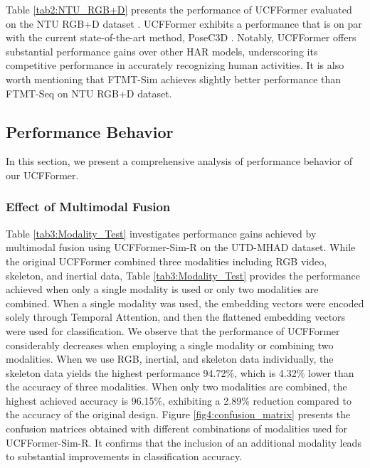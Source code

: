 Table \ref{tab2:NTU_RGB+D} presents the performance of UCFFormer evaluated on the NTU RGB+D dataset \cite{shahroudy2016ntu}.
UCFFormer exhibits a performance that is on par with the current state-of-the-art method, PoseC3D \cite{duan2022revisiting}. Notably, UCFFormer offers substantial performance gains over other HAR models, underscoring its competitive performance in accurately recognizing human activities. It is also worth mentioning that FTMT-Sim achieves slightly better performance than FTMT-Seq on NTU RGB+D dataset. 

\subsection{Performance Behavior}
In this section, we present a comprehensive analysis of performance behavior of our UCFFormer.

\subsubsection{Effect of Multimodal Fusion}
Table \ref{tab3:Modality_Test} investigates performance gains achieved by multimodal fusion using UCFFormer-Sim-R on the UTD-MHAD dataset. 
While the original UCFFormer combined three modalities including RGB video, skeleton, and inertial data, Table \ref{tab3:Modality_Test} provides the performance achieved when only a single modality is used or only two modalities are combined. When a single modality was used, the embedding vectors were encoded solely through Temporal Attention, and then the flattened embedding vectors were used for classification. We observe that the performance of UCFFormer considerably decreases when employing a single modality or combining two modalities. When we use RGB, inertial, and skeleton data individually, the skeleton data yields the highest performance 94.72\%, which is 4.32\% lower than the accuracy of three modalities. When only two modalities are combined, the highest achieved accuracy is 96.15\%, exhibiting a 2.89\% reduction compared to the accuracy of the original design.
Figure \ref{fig4:confusion_matrix} presents the confusion matrices obtained with different combinations of modalities used for UCFFormer-Sim-R. It confirms that the inclusion of an additional modality leads to substantial improvements in classification accuracy.

